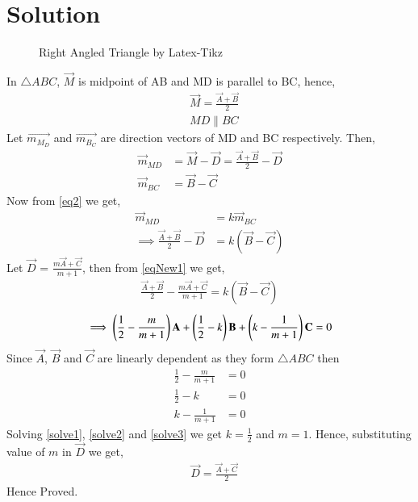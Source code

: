 \documentclass[journal,12pt,twocolumn]{IEEEtran}
\begin{document}
\section{Solution}
\renewcommand{\thefigure}{1}
\begin{figure}[!h]
\centering
\resizebox{\columnwidth}{!}{}
\caption{Right Angled Triangle by Latex-Tikz}
\label{myfig}
\end{figure}
In $\triangle{ABC}$, $\vec{M}$ is midpoint of AB and MD is parallel to BC, hence,
\begin{align}
&\vec{M} = \frac{\vec{A}+\vec{B}}{2}\label{eq1}\\
&MD \parallel BC\label{eq2}
\end{align}
Let $\vec{m_M_D}$ and $\vec{m_B_C}$ are direction vectors of MD and BC respectively. Then,
\begin{align}
\vec{m}_{MD} &= \vec{M} - \vec{D} = \frac{\vec{A}+\vec{B}}{2} - \vec{D}\\
\vec{m}_{BC} &= \vec{B} - \vec{C}
\end{align}
Now from \eqref{eq2} we get,
\begin{align}
\vec{m}_{MD} &= k\vec{m}_{BC}\\
\implies\frac{\vec{A}+\vec{B}}{2} - \vec{D} &= k(\vec{B} - \vec{C})\label{eqNew1}
\end{align}
Let $\vec{D}$ = $\frac{m\vec{A}+\vec{C}}{m+1}$, then from \eqref{eqNew1} we get,
\begin{align}
\frac{\vec{A}+\vec{B}}{2} - \frac{m\vec{A}+\vec{C}}{m+1} = k(\vec{B} - \vec{C})
\end{align}
\begin{align}
\implies\left(\frac{1}{2}-\frac{m}{m+1}\right)\mathbf{A}+\left(\frac{1}{2}-k\right)\mathbf{B}+\left(k-\frac{1}{m+1}\right)\mathbf{C} =0
\end{align}
Since $\vec{A}$, $\vec{B}$ and $\vec{C}$ are linearly dependent as they form $\triangle{ABC}$ then 
\begin{align}
\frac{1}{2}-\frac{m}{m+1} &= 0\label{solve1}\\
\frac{1}{2}-k & = 0\label{solve2}\\
k-\frac{1}{m+1} &= 0\label{solve3}
\end{align}
Solving \eqref{solve1}, \eqref{solve2} and \eqref{solve3} we get $k=\frac{1}{2}$ and $m = 1$. Hence, substituting value of $m$ in $\vec{D}$ we get,
\begin{align}
&\vec{D} = \frac{\vec{A}+\vec{C}}{2}\label{eq3}
\end{align}
Hence Proved.\\
\end{document}
